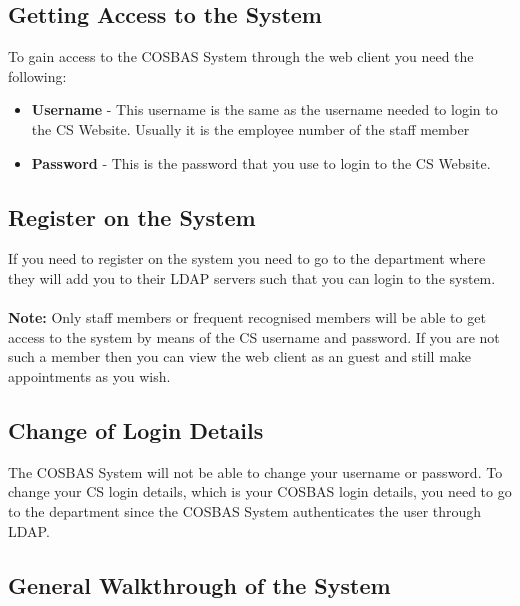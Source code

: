 \subsection{Getting Access to the System}
To gain access to the COSBAS System through the web client you need the following:
	\begin{itemize}
		\item{\textbf{Username} - This username is the same as the username needed to login to the CS Website. 
					   Usually it is the employee number of the staff member} 
		\item{\textbf{Password} - This is the password that you use to login to the CS Website.}
	\end{itemize}

\subsection{Register on the System}
If you need to register on the system you need to go to the department where they will add you to their LDAP servers such that you can login to the system. \\
\\
\textbf{Note:} Only staff members or frequent recognised members will be able to get access to the system by means of the CS username and password. If you are not such a member then you can view the web client as an guest and still make appointments as you wish.

\subsection{Change of Login Details}
The COSBAS System will not be able to change your username or password. To change your CS login details, which is your COSBAS login details, you need to go to the department since the COSBAS System authenticates the user through LDAP.

\subsection{General Walkthrough of the System}
